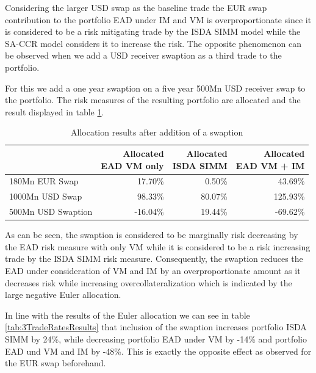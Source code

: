 \documentclass[../Thesis_AHoecherl.tex]{subfiles}
\begin{document}
    Considering the larger USD swap as the baseline trade the EUR swap contribution to the portfolio \gls{EAD} under \gls{IM} and \gls{VM} is overproportionate since it is considered to be a risk mitigating trade by the \gls{ISDA SIMM} model while the \gls{SA-CCR} model considers it to increase the risk. The opposite phenomenon can be observed when we add a USD receiver swaption as a third trade to the portfolio.

    For this we add a one year swaption on a five year 500Mn USD receiver swap to the portfolio. The risk measures of the resulting portfolio are allocated and the result displayed in table \ref{tab:3TradeRatesAllocation}. 

    \begin{table}[htbp]
        \centering
        \begin{tabular}{l||r|r|r}
                & \makecell{Allocated \\ \gls{EAD} \gls{VM} only} &\makecell{Allocated \\ \gls{ISDA SIMM}} &\makecell{Allocated \\ \gls{EAD} \gls{VM} + IM} \\
                \toprule
        180Mn EUR Swap & 17.70\% & 0.50\% & 43.69\% \\
        1000Mn USD Swap & 98.33\% & 80.07\% & 125.93\% \\
        500Mn USD Swaption & -16.04\% & 19.44\% & -69.62\% \\
        \end{tabular}%
        \caption{Allocation results after addition of a swaption}
        \label{tab:3TradeRatesAllocation}%
    \end{table}%
    As can be seen, the swaption is considered to be marginally risk decreasing by the \gls{EAD} risk measure with only \gls{VM} while it is considered to be a risk increasing trade by the \gls{ISDA SIMM} risk measure. Consequently, the swaption reduces the \gls{EAD} under consideration of \gls{VM} and \gls{IM} by an overproportionate amount as it decreases risk while increasing overcollateralization which is indicated by the large negative Euler allocation.

    In line with the results of the Euler allocation we can see in table \ref{tab:3TradeRatesResults} that inclusion of the swaption increases portfolio \gls{ISDA SIMM} by 24\%, while decreasing portfolio \gls{EAD} under \gls{VM} by -14\% and portfolio \gls{EAD} und \gls{VM} and \gls{IM} by -48\%. This is exactly the opposite effect as observed for the EUR swap beforehand.
\end{document}
